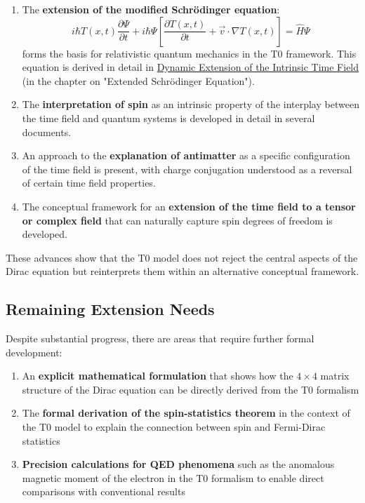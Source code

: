 \documentclass[12pt,a4paper]{article}
\newcommand{\Tfieldt}{T(x,t)}
\begin{document}
	\begin{enumerate}
		\item The \textbf{extension of the modified Schrödinger equation}:
		\begin{equation}
			i\hbar \Tfieldt \frac{\partial\Psi}{\partial t} + i\hbar \Psi \left[\frac{\partial \Tfieldt}{\partial t} + \vec{v}\cdot\nabla\Tfieldt\right] = \hat{H} \Psi
		\end{equation}
		forms the basis for relativistic quantum mechanics in the T0 framework. This equation is derived in detail in \href{https://github.com/jpascher/T0-Time-Mass-Duality/tree/main/2/pdf/English/DynamicTF-SchrodingerExtensions_En.pdf}{Dynamic Extension of the Intrinsic Time Field} (in the chapter on "Extended Schrödinger Equation").
		
		\item The \textbf{interpretation of spin} as an intrinsic property of the interplay between the time field and quantum systems is developed in detail in several documents.
		
		\item An approach to the \textbf{explanation of antimatter} as a specific configuration of the time field is present, with charge conjugation understood as a reversal of certain time field properties.
		
		\item The conceptual framework for an \textbf{extension of the time field to a tensor or complex field} that can naturally capture spin degrees of freedom is developed.
	\end{enumerate}
	
	These advances show that the T0 model does not reject the central aspects of the Dirac equation but reinterprets them within an alternative conceptual framework.
	
	\subsection{Remaining Extension Needs}
	\label{subsec:dirac_extensions}
	
	Despite substantial progress, there are areas that require further formal development:
	
	\begin{enumerate}
		\item An \textbf{explicit mathematical formulation} that shows how the $4 \times 4$ matrix structure of the Dirac equation can be directly derived from the T0 formalism
		
		\item The \textbf{formal derivation of the spin-statistics theorem} in the context of the T0 model to explain the connection between spin and Fermi-Dirac statistics
		
		\item \textbf{Precision calculations for QED phenomena} such as the anomalous magnetic moment of the electron in the T0 formalism to enable direct comparisons with conventional results
	\end{enumerate}
	
\end{document}
